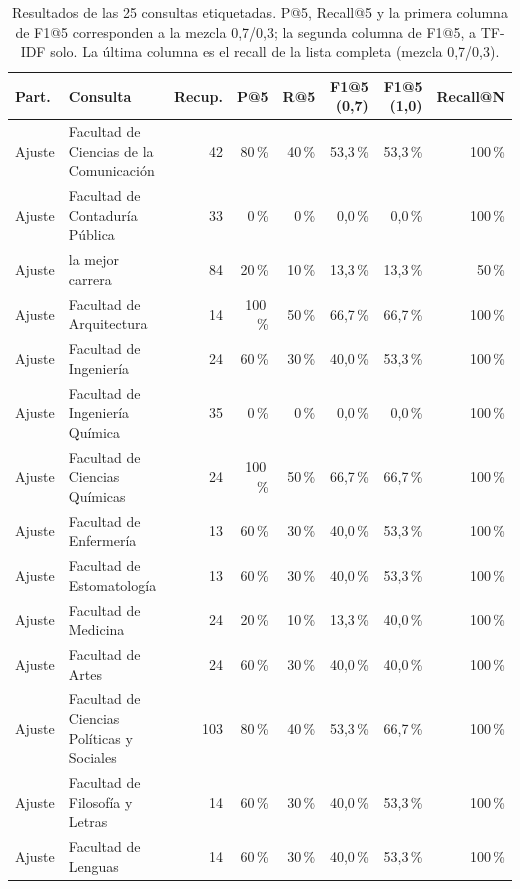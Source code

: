 \documentclass[11pt,letterpaper]{article}
\begin{document}
	\begin{table}[!htbp]
		\centering
		\caption{Resultados de las 25 consultas etiquetadas. P@5, Recall@5 y la primera columna de F1@5 corresponden a la mezcla 0,7/0,3; la segunda columna de F1@5, a TF-IDF solo. La última columna es el recall de la lista completa (mezcla 0,7/0,3).}\label{tab:porconsulta}
		\scriptsize
		\setlength{\tabcolsep}{3.5pt}
		\begin{tabularx}{\linewidth}{@{}l X r r r r r r@{}}
			\toprule
			\rowcolor{wash}\textbf{Part.} & \textbf{Consulta} & \textbf{Recup.} & \textbf{P@5} & \textbf{R@5} & \textbf{F1@5 (0,7)} & \textbf{F1@5 (1,0)} & \textbf{Recall@N}\\
			\midrule
			Ajuste & Facultad de Ciencias de la Comunicación & 42 & 80\,\% & 40\,\% & 53,3\,\% & 53,3\,\% & 100\,\%\\
			Ajuste & Facultad de Contaduría Pública & 33 & 0\,\% & 0\,\% & 0,0\,\% & 0,0\,\% & 100\,\%\\
			Ajuste & la mejor carrera & 84 & 20\,\% & 10\,\% & 13,3\,\% & 13,3\,\% & 50\,\%\\
			Ajuste & Facultad de Arquitectura & 14 & 100\,\% & 50\,\% & 66,7\,\% & 66,7\,\% & 100\,\%\\
			Ajuste & Facultad de Ingeniería & 24 & 60\,\% & 30\,\% & 40,0\,\% & 53,3\,\% & 100\,\%\\
			Ajuste & Facultad de Ingeniería Química & 35 & 0\,\% & 0\,\% & 0,0\,\% & 0,0\,\% & 100\,\%\\
			Ajuste & Facultad de Ciencias Químicas & 24 & 100\,\% & 50\,\% & 66,7\,\% & 66,7\,\% & 100\,\%\\
			Ajuste & Facultad de Enfermería & 13 & 60\,\% & 30\,\% & 40,0\,\% & 53,3\,\% & 100\,\%\\
			Ajuste & Facultad de Estomatología & 13 & 60\,\% & 30\,\% & 40,0\,\% & 53,3\,\% & 100\,\%\\
			Ajuste & Facultad de Medicina & 24 & 20\,\% & 10\,\% & 13,3\,\% & 40,0\,\% & 100\,\%\\
			Ajuste & Facultad de Artes & 24 & 60\,\% & 30\,\% & 40,0\,\% & 40,0\,\% & 100\,\%\\
			Ajuste & Facultad de Ciencias Políticas y Sociales & 103 & 80\,\% & 40\,\% & 53,3\,\% & 66,7\,\% & 100\,\%\\
			Ajuste & Facultad de Filosofía y Letras & 14 & 60\,\% & 30\,\% & 40,0\,\% & 53,3\,\% & 100\,\%\\
			Ajuste & Facultad de Lenguas & 14 & 60\,\% & 30\,\% & 40,0\,\% & 53,3\,\% & 100\,\%\\

\end{tabularx}
\end{table}
\end{document}
